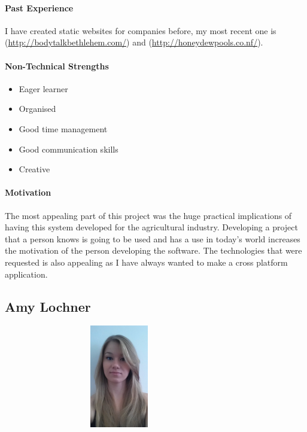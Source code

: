 \documentclass[english]{article}
\begin{document}
		\paragraph{Past Experience}
		I have created static websites for companies before, my most recent one is (\href{http://bodytalkbethlehem.com/}{http://bodytalkbethlehem.com/}) and (\href{http://honeydewpools.co.nf/}{http://honeydewpools.co.nf/}).
		
		\paragraph{Non-Technical Strengths}
		\begin{itemize}
			\setlength\itemsep{0.2em}
			\item Eager learner
			\item Organised 
			\item Good time management
			\item Good communication skills
			\item Creative
		\end{itemize}
		
		\paragraph{Motivation}
		The most appealing part of this project was the huge practical implications of having this system developed for the agricultural industry. Developing a project that a person knows is going to be used and has a use in today’s world increases the motivation of the person developing the software. The technologies that were requested is also appealing as I have always wanted to make a cross platform application.
		
		\subsection{Amy Lochner}
		\begin{figure}
			\begin{center}
				\includegraphics[width=8cm, height=4.5cm, angle=90]{amy.jpg}
			\end{center}
		\end{figure}
\end{document}
